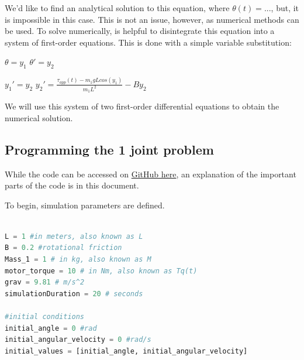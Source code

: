 \documentclass{article}
\begin{document}
\vspace{24pt}

\noindent \justifying We'd like to find an analytical solution to this equation, where $\theta(t) = ...$, but, it is impossible in this case. This is not an issue, however, as numerical methods can be used. To solve numerically, is helpful to disintegrate this equation into a system of first-order equations. This is done with a simple variable substitution:

\vspace{24pt}
\centering $\theta = y_1$    $\theta' = y_2$

\vspace{11pt}

\centering $y_1' = y_2$   \hspace{1cm}  $y_2' = \frac{\tau_{app}(t) - m_1gLcos(y_1)}{m_1L^2} - By_2$

\vspace{24pt}

\noindent \justifying We will use this system of two first-order differential equations to obtain the numerical solution.


\newpage

\subsection{Programming the 1 joint problem}
While the code can be accessed on \textcolor{blue}{\href{https://github.com/natebechard/Robotic-Arm-Simulation-From-First-Principles/blob/main/1_joint_problem.py}{GitHub here}}, an explanation of the important parts of the code is in this document. 

\vspace{24pt}

\noindent \justifying To begin, simulation parameters are defined.
\begin{lstlisting}[language=Python]

L = 1 #in meters, also known as L
B = 0.2 #rotational friction
Mass_1 = 1 # in kg, also known as M
motor_torque = 10 # in Nm, also known as Tq(t)
grav = 9.81 # m/s^2
simulationDuration = 20 # seconds

#initial conditions
initial_angle = 0 #rad
initial_angular_velocity = 0 #rad/s
initial_values = [initial_angle, initial_angular_velocity]

\end{lstlisting}
\end{document}
